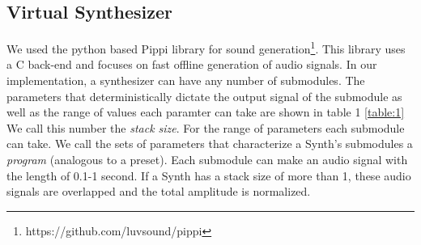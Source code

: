 \documentclass{nime-alternate} %
\begin{document}
\subsection{Virtual Synthesizer}
We used the python based Pippi library for sound generation\footnote{https://github.com/luvsound/pippi}. This library uses a C back-end and focuses on fast offline generation of audio signals. In our implementation, a synthesizer can have any number of submodules. The parameters that deterministically dictate the output signal of the submodule as well as the range of values each paramter can take are shown in table 1 \ref{table:1} We call this number the \textit{stack size}. For the range of parameters each submodule can take. We call the sets of parameters that characterize a Synth's submodules a \textit{program} (analogous to a preset).  Each submodule can make an audio signal with the length of 0.1-1 second. If a Synth has a stack size of more than 1, these audio signals are overlapped and the total amplitude is normalized.\\
\begin{table}[h!]
\centering
{}
\caption{Synthesizer Submodule Parameters. Despite the simplicity of the paramters and our efforts at constraining the ranges, the number of paramters that can be randomly chosen for each submodule is in the order of $10^{15}$ }
\label{table:1}
\end{table}
\end{document}

